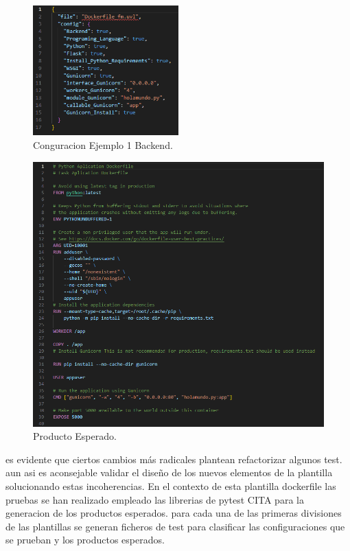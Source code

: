 \documentclass[12pt, a4paper, twoside]{article}
\begin{document}
\newpage

\begin{figure}[ht]
	\centering
	  \includegraphics[width=0.5\textwidth]{dockerfile.configuracion-backend.png}
	\caption{Conguracion Ejemplo 1 Backend.}
\end{figure}

\begin{figure}[ht]
	\centering
	  \includegraphics[width=1\textwidth]{dockerfile.backend.producto.png}
	\caption{Producto Esperado.}
\end{figure}

\newpage

es evidente que ciertos cambios más radicales plantean refactorizar algunos test. aun asi es aconsejable validar el diseño de los nuevos elementos de la plantilla solucionando estas incoherencias.
En el contexto de esta plantilla dockerfile las pruebas se han realizado empleado las librerias de pytest CITA para la generacion de los productos esperados.
para cada una de las primeras divisiones de las plantillas se generan ficheros de test para clasificar las configuraciones que se prueban y los productos esperados.
\end{document}
